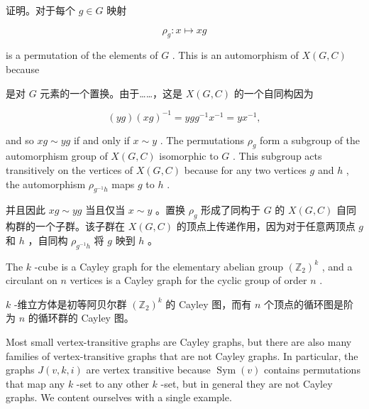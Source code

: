 \documentclass[10pt]{article}
\begin{document}
\begin{tcolorbox}\relax
证明。对于每个 \(g \in  G\) 映射
\end{tcolorbox}

\[
{\rho }_{g} : x \mapsto  {xg}
\]

is a permutation of the elements of \(G\) . This is an automorphism of \(X\left( {G,C}\right)\) because

\begin{tcolorbox}\relax
是对 \(G\) 元素的一个置换。由于……，这是 \(X\left( {G,C}\right)\) 的一个自同构因为
\end{tcolorbox}

\[
\left( {yg}\right) {\left( xg\right) }^{-1} = {yg}{g}^{-1}{x}^{-1} = y{x}^{-1},
\]

and so \({xg} \sim  {yg}\) if and only if \(x \sim  y\) . The permutations \({\rho }_{g}\) form a subgroup of the automorphism group of \(X\left( {G,C}\right)\) isomorphic to \(G\) . This subgroup acts transitively on the vertices of \(X\left( {G,C}\right)\) because for any two vertices \(g\) and \(h\) , the automorphism \({\rho }_{{g}^{-1}h}\) maps \(g\) to \(h\) .

\begin{tcolorbox}\relax
并且因此 \({xg} \sim  {yg}\) 当且仅当 \(x \sim  y\) 。置换 \({\rho }_{g}\) 形成了同构于 \(G\) 的 \(X\left( {G,C}\right)\) 自同构群的一个子群。该子群在 \(X\left( {G,C}\right)\) 的顶点上传递作用，因为对于任意两顶点 \(g\) 和 \(h\) ，自同构 \({\rho }_{{g}^{-1}h}\) 将 \(g\) 映到 \(h\) 。
\end{tcolorbox}

The \(k\) -cube is a Cayley graph for the elementary abelian group \({\left( {\mathbb{Z}}_{2}\right) }^{k}\) , and a circulant on \(n\) vertices is a Cayley graph for the cyclic group of order \(n\) .

\begin{tcolorbox}\relax
\(k\) -维立方体是初等阿贝尔群 \({\left( {\mathbb{Z}}_{2}\right) }^{k}\) 的 Cayley 图，而有 \(n\) 个顶点的循环图是阶为 \(n\) 的循环群的 Cayley 图。
\end{tcolorbox}

Most small vertex-transitive graphs are Cayley graphs, but there are also many families of vertex-transitive graphs that are not Cayley graphs. In particular, the graphs \(J\left( {v,k,i}\right)\) are vertex transitive because \(\operatorname{Sym}\left( v\right)\) contains permutations that map any \(k\) -set to any other \(k\) -set, but in general they are not Cayley graphs. We content ourselves with a single example.
\end{document}
